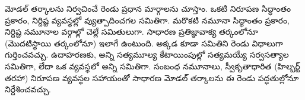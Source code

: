 \documentclass[../../../include/open-logic-section]{subfiles}
\begin{document}
మోడల్ తర్కాలను నిర్వచించే రెండు ప్రధాన మార్గాలను చూస్తాం. ఒకటి నిరూపణ సిద్ధాంతం ప్రకారం, నిర్దిష్ట  వ్యవస్థల్లో వ్యుత్పాదించగల  సమితిగా. మరొకటి నమూనా సిద్ధాంతం ప్రకారం, నిర్దిష్ట నమూనాల వర్గాల్లో చెల్లే  సమితులుగా. సాధారణ ప్రతిజ్ఞావాక్య తర్కంలోనూ (మొదటిస్థాయి తర్కంలోనూ) ఇలాగే ఉంటుంది. అక్కడ కూడా  సమితిని రెండు విధాలుగా గుర్తించవచ్చు. ఉదాహరణకు, అన్ని సత్యమూల్య కేటాయింపుల్లో సత్యమయ్యే సర్వసత్యాల సమితిగా, లేదా ఒక  వ్యవస్థలో  అన్ని  సమితిగా. సంబంధ నమూనాలు, స్వీకృతాధారిత (హిల్బర్ట్ తరహా) నిరూపణ వ్యవస్థల సహాయంతో సాధారణ మోడల్ తర్కాలను ఈ రెండు పద్ధతుల్లోనూ నిర్దేశించవచ్చు.
\end{document}

